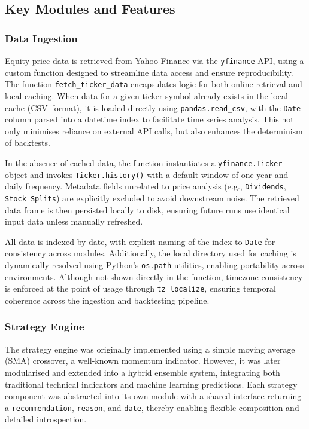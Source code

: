 \subsection{Key Modules and Features}

\subsubsection{Data Ingestion}
Equity price data is retrieved from Yahoo Finance via the \texttt{yfinance} API, using a custom function designed to streamline data access and ensure reproducibility. The function \texttt{fetch\_ticker\_data} encapsulates logic for both online retrieval and local caching. When data for a given ticker symbol already exists in the local cache (CSV\ format), it is loaded directly using \texttt{pandas.read\_csv\(\)}, with the \texttt{Date} column parsed into a datetime index to facilitate time series analysis. This not only minimises reliance on external API calls, but also enhances the determinism of backtests.

In the absence of cached data, the function instantiates a \texttt{yfinance.Ticker} object and invokes \texttt{Ticker.history()} with a default window of one year and daily frequency. Metadata fields unrelated to price analysis (e.g., \texttt{Dividends}, \texttt{Stock Splits}) are explicitly excluded to avoid downstream noise. The retrieved data frame is then persisted locally to disk, ensuring future runs use identical input data unless manually refreshed.

All data is indexed by date, with explicit naming of the index to \texttt{Date} for consistency across modules. Additionally, the local directory used for caching is dynamically resolved using Python’s \texttt{os.path} utilities, enabling portability across environments. Although not shown directly in the function, timezone consistency is enforced at the point of usage through \texttt{tz\_localize}, ensuring temporal coherence across the ingestion and backtesting pipeline.

\subsubsection{Strategy Engine}

The strategy engine was originally implemented using a simple moving average (SMA) crossover, a well-known momentum indicator. However, it was later modularised and extended into a hybrid ensemble system, integrating both traditional technical indicators and machine learning predictions. Each strategy component was abstracted into its own module with a shared interface returning a \texttt{recommendation}, \texttt{reason}, and \texttt{date}, thereby enabling flexible composition and detailed introspection.

